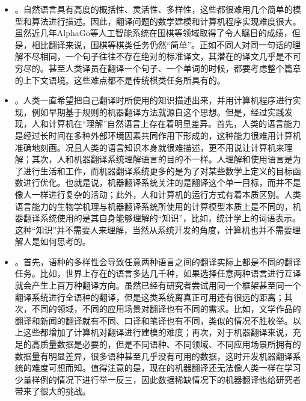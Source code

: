 \begin{itemize}
\vspace{0.5em}
\item {\small{}}。自然语言具有高度的概括性、灵活性、多样性，这些都很难用几个简单的模型和算法进行描述。因此，翻译问题的数学建模和计算机程序实现难度很大。虽然近几年AlphaGo等人工智能系统在围棋等领域取得了令人瞩目的成绩，但是，相比翻译来说，围棋等棋类任务仍然“简单”。正如不同人对同一句话的理解不尽相同，一个句子往往不存在绝对的标准译文，其潜在的译文几乎是不可穷尽的。甚至人类译员在翻译一个句子、一个单词的时候，都要考虑整个篇章的上下文语境。这些难点都不是传统棋类任务所具有的。
\vspace{0.5em}
\item {\small{}}。人类一直希望把自己翻译时所使用的知识描述出来，并用计算机程序进行实现，例如早期基于规则的机器翻译方法就源自这个思想。但是，经过实践发现，人和计算机在“理解”自然语言上存在着明显差异。首先，人类的语言能力是经过长时间在多种外部环境因素共同作用下形成的，这种能力很难用计算机准确地刻画。况且人类的语言知识本身就很难描述，更不用说让计算机来理解；其次，人和机器翻译系统理解语言的目的不一样。人理解和使用语言是为了进行生活和工作，而机器翻译系统更多的是为了对某些数学上定义的目标函数进行优化。也就是说，机器翻译系统关注的是翻译这个单一目标，而并不是像人一样进行复杂的活动；此外，人和计算机的运行方式有着本质区别。人类语言能力的生物学机理与机器翻译系统所使用的计算模型本质上是不同的，机器翻译系统使用的是其自身能够理解的“知识”，比如，统计学上的词语表示。这种“知识”并不需要人来理解，当然从系统开发的角度，计算机也并不需要理解人是如何思考的。
\vspace{0.5em}
\item {\small{}}。首先，语种的多样性会导致任意两种语言之间的翻译实际上都是不同的翻译任务。比如，世界上存在的语言多达几千种，如果选择任意两种语言进行互译就会产生上百万种翻译方向。虽然已经有研究者尝试用同一个框架甚至同一个翻译系统进行全语种的翻译，但是这类系统离真正可用还有很远的距离；其次，不同的领域，不同的应用场景对翻译也有不同的需求。比如，文学作品的翻译和新闻的翻译就有不同、口译和笔译也有不同，类似的情况不胜枚举。以上这些都增加了计算机对翻译进行建模的难度；再次，对于机器翻译来说，充足的高质量数据是必要的，但是不同语种、不同领域、不同应用场景所拥有的数据量有明显差异，很多语种甚至几乎没有可用的数据，这时开发机器翻译系统的难度可想而知。值得注意的是，现在的机器翻译还无法像人类一样在学习少量样例的情况下进行举一反三，因此数据稀缺情况下的机器翻译也给研究者带来了很大的挑战。
\vspace{0.5em}
\end{itemize}

